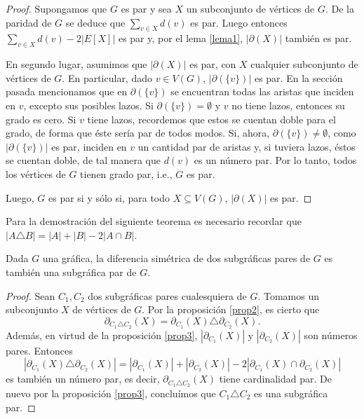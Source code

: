 \begin{proof}
Supongamos que $G$ es par y sea $X$ un subconjunto de vértices de $G$. De la paridad de $G$ se deduce que $\sum_{v \in X} d(v)$ es par. Luego entonces $\sum _{v \in X} d(v)- 2 \big |E[X]\big |$ es par y, por el lema \ref{lema1}, $\big|\partial(X)\big|$ también es par.

En segundo lugar, asumimos que $\big|\partial(X)\big|$ es par, con $X$ cualquier subconjunto de vértices de $G$. En particular, dado $v \in V(G)$, $\big|\partial(\{v\})\big|$ es par. En la sección pasada mencionamos que en $\partial(\{v\})$ se encuentran todas las aristas que inciden en $v$, excepto sus posibles lazos. Si $\partial(\{v\}) = \emptyset$ y $v$ no tiene lazos, entonces su grado es cero. Si $v$ tiene lazos, recordemos que estos se cuentan doble para el grado, de forma que éste sería par de todos modos. Si, ahora, $\partial(\{v\}) \neq \emptyset$, como $\big| \partial(\{v\}) \big|$ es par, inciden en $v$ un cantidad par de aristas y, si tuviera lazos, éstos se cuentan doble, de tal manera que $d(v)$ es un número par. Por lo tanto, todos los vértices de $G$ tienen grado par, i.e., $G$ es par.

Luego, $G$ es par si y sólo si, para todo $X \subseteq V(G)$, $|\partial(X)|$ es par.

\end{proof}

Para la demostración del siguiente teorema es necesario recordar que $|A \triangle B| = |A|+|B| - 2|A \cap B|$.

\begin{teo} \label{teo:difsimciclos}
 Dada $G$ una gráfica, la diferencia simétrica de dos subgráficas pares de $G$ es también una subgráfica par de $G$.
\end{teo}

\begin{proof}
Sean $C_{1}, C_{2}$ dos subgráficas pares cualesquiera de $G$. Tomamos un subconjunto $X$ de vértices de $G$. Por la proposición \ref{prop2}, es cierto que 
$$\partial_{C_{1} \triangle C_{2}}(X) = \partial_{C_{1}}(X) \triangle \partial_{C_{2}}(X).$$
Además, en virtud de la proposición \ref{prop3}, $|\partial_{C_{1}}(X)|$ y $|\partial_{C_{2}}(X)|$ son números pares. Entonces 
$$|\partial_{C_{1}}(X) \triangle \partial_{C_{2}}(X)| = |\partial_{C_{1}}(X)| + |\partial_{C_{2}}(X)| - 2 |\partial_{C_{1}}(X) \cap \partial_{C_{2}}(X)|$$
es también un número par, es decir, $\partial_{C_{1} \triangle C_{2}}(X)$ tiene cardinalidad par. De nuevo por la proposición \ref{prop3}, concluímos que $C_{1} \triangle C_{2}$ es una subgráfica par.

\end{proof}

